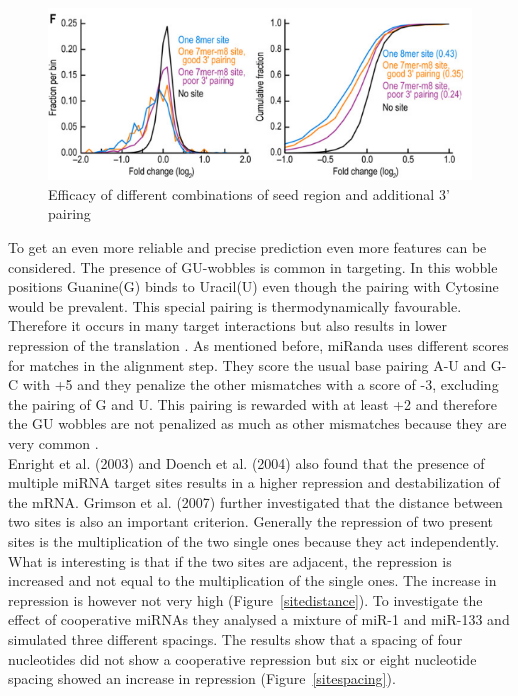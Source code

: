 \documentclass[12pt,  a4paper]{report}
\begin{document}
\begin{figure}[h]
\centering
\includegraphics[scale=0.7]{results/site_efficacy.PNG} 
\caption{Efficacy of different combinations of seed region and additional 3' pairing}
\label{efficacy}
\end{figure}



To get an even more reliable and precise prediction even more features can be considered. The presence of GU-wobbles is common in targeting. In this wobble positions Guanine(G) binds to Uracil(U) even though the pairing with Cytosine would be prevalent. This special pairing is thermodynamically favourable. Therefore it occurs in many target interactions but also results in lower repression of the translation \cite{Doench}. As mentioned before, miRanda uses different scores for matches in the alignment step. They score the usual base pairing A-U and G-C with +5 and they penalize the other mismatches with a score of -3, excluding the pairing of G and U. This pairing is rewarded with at least +2 and therefore the GU wobbles are not penalized as much as other mismatches because they are very common \cite{Enright}. \\

Enright et al. (2003) and Doench et al. (2004) also found that the presence of multiple miRNA target sites results in a higher repression and destabilization of the mRNA. Grimson et al. (2007) further investigated that the distance between two sites is also an important criterion. Generally the repression of two present sites is the multiplication of the two single ones because they act independently. What is interesting is that if the two sites are adjacent, the repression is increased and not equal to the multiplication of the single ones. The increase in repression is however not very high (Figure~\ref{sitedistance}). To investigate the effect of cooperative miRNAs they analysed a mixture of miR-1 and miR-133 and simulated three different spacings. The results show that a spacing of four nucleotides did not show a cooperative repression but six or eight nucleotide spacing showed an increase in repression (Figure~\ref{sitespacing}). \\
\end{document}
